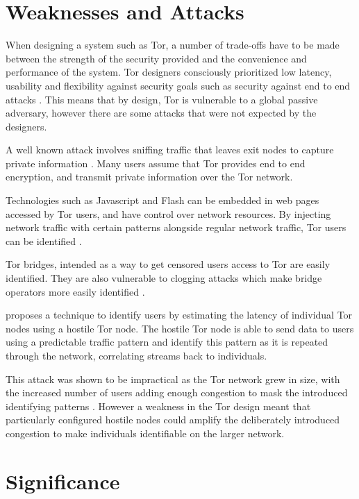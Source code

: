 \documentclass[conference]{IEEEtran}
\begin{document}
\section{Weaknesses and Attacks}

When designing a system such as Tor, a number of trade-offs have to be made
between the strength of the security provided and the convenience and
performance of the system. Tor designers consciously prioritized low latency,
usability and flexibility against security goals such as security against end
to end attacks \parencite[4]{Dingledine:2004p314}. This means that by design,
Tor is vulnerable to a global passive adversary, however there are some attacks
that were not expected by the designers.

A well known attack involves sniffing traffic that leaves exit nodes to
capture private information \parencite{website:tor-password-leak}. Many users
assume that Tor provides end to end encryption, and transmit private information
over the Tor network.

Technologies such as Javascript and Flash can be embedded in web pages accessed
by Tor users, and have control over network resources. By injecting network
traffic with certain patterns alongside regular network traffic, Tor users can
be identified \parencite{Abbott:2007p298}.

Tor bridges, intended as a way to get censored users access to Tor are easily
identified. They are also vulnerable to clogging attacks which make bridge
operators more easily identified \parencite{McLachlan:2009p197}.

\textcite{Murdoch:2005p325} proposes a technique to identify users by estimating
the latency of individual Tor nodes using a hostile Tor node. The hostile Tor
node is able to send data to users using a predictable traffic pattern and
identify this pattern as it is repeated through the network, correlating streams
back to individuals.

This attack was shown to be impractical as the Tor network grew in size, with
the increased number of users adding enough congestion to mask the introduced
identifying patterns \parencite{Evans:2009p315}. However a weakness in the Tor
design meant that particularly configured hostile nodes could amplify the
deliberately introduced congestion to make individuals identifiable on the
larger network.

\section{Significance}
\end{document}
